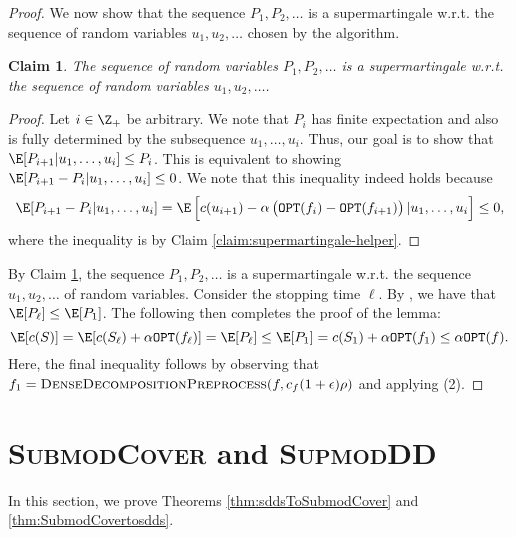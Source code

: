\documentclass{article}
\newtheorem{claim}{Claim}[section]
\newcommand{\OPT}{\ensuremath{\mathtt{OPT}}\xspace}
\newcommand{\supmoddensitydeletionset}{\textsc{SupmodDD}\xspace}
\newcommand{\submodcover}{\textsc{SubmodCover}\xspace}
\begin{document}
\begin{proof}
    We now show that the sequence $P_1, P_2, \ldots$ is a supermartingale w.r.t. the sequence of random variables $u_1, u_2, \ldots$ chosen by the algorithm.
    \begin{claim}\label{claim:supermartingale:main}
        The sequence of random variables $P_1, P_2, \ldots$ is a supermartingale  w.r.t. the sequence of random variables $u_1, u_2, \ldots$.
    \end{claim}
    \begin{proof}
        Let $i\in \Z_+$ be arbitrary. We note that $P_i$ has finite expectation and also is fully determined by the subsequence $u_1, \ldots, u_i$. Thus, our goal is to show that $\E[P_{i+1} | u_1, \ldots, u_i] \leq P_i$. This is equivalent to showing $\E[P_{i+1} - P_i | u_1, \ldots, u_{i}] \leq 0$. We note that this inequality indeed holds because
        $$\E[P_{i+1} - P_i | u_1, \ldots, u_{i}] = \E\left[c(u_{i+1}) - \alpha\left(\OPT(f_i) - \OPT(f_{i+1})\right) |  u_1, \ldots, u_i\right] \leq 0,$$
        where the inequality is by Claim \ref{claim:supermartingale-helper}.
    \end{proof}

    By Claim \ref{claim:supermartingale:main}, the sequence $P_1, P_2, \ldots$ is a supermartingale w.r.t. the sequence $u_1, u_2, \ldots$ of random variables. Consider the stopping time $\ell$. By , we have that $\E[P_\ell] \leq \E[P_1]$. The following then completes the proof of the lemma:
    $$\E[c(S)] = \E[c(S_{\ell}) + \alpha\OPT(f_{\ell})] = \E[P_{\ell}] \leq \E[P_1] = c(S_1) + \alpha\OPT(f_1) \leq \alpha\OPT(f).$$
    Here, the final inequality follows by observing that $f_1 = \textsc{DenseDecompositionPreprocess}(f, c_f(1+\epsilon)\rho)$ and applying (2).
\end{proof}  \section{\submodcover and \supmoddensitydeletionset}\label{sec:submodcover-reductions}

In this section, we prove Theorems \ref{thm:sddsToSubmodCover} and \ref{thm:SubmodCovertosdds}. 
\end{document}
